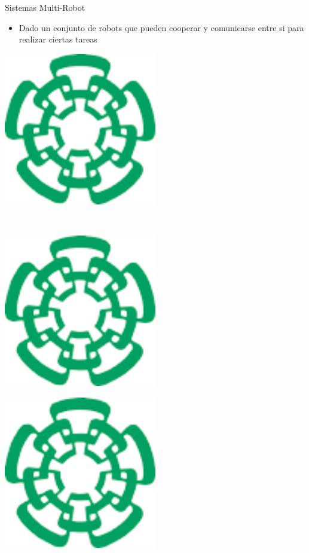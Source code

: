 \documentclass[
	11pt, %
]{beamer}
\newcommand\FourQuad[4]{%
  \begin{minipage}[b][.33\textheight][t] 
    {.48\textwidth}#1\end{minipage}\hfill%
    \begin{minipage}[b][.33\textheight][t] 
      {.48\textwidth}#2\end{minipage}\\[0.5em]
      \begin{minipage}[b][.33\textheight][t] 
        {.48\textwidth}#3\end{minipage}\hfill
        \begin{minipage}[b][.33\textheight][t] 
          {.48\textwidth}#4\end{minipage}%
}
\begin{document}
\begin{frame}{Sistemas Multi-Robot}
  \FourQuad%
   { \begin{itemize}
      \item<1-> Dado un conjunto de robots que pueden cooperar y comunicarse entre si para realizar ciertas tareas\\
     \end{itemize}\vspace{2cm}\hspace{2.7cm}
   }
   {
     \includegraphics[width=0.5\textwidth]{cinvestavlogo}
   }
   {
     \includegraphics[width=0.5\textwidth]{cinvestavlogo}
   }
   {
     \includegraphics[width=0.5\textwidth]{cinvestavlogo}
   }

\end{frame}
\end{document}
